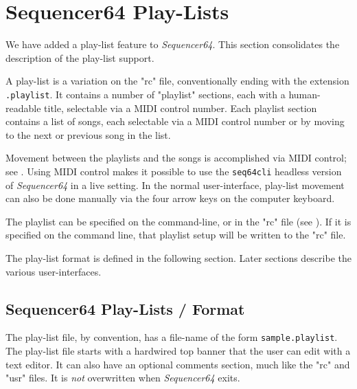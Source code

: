 %
%
%

\section{Sequencer64 Play-Lists}
\label{sec:playlist}

   We have added a play-list feature to \textsl{Sequencer64}.
   This section consolidates the description of the play-list support.

   A play-list is a variation on the "rc" file, conventionally ending with the
   extension \texttt{.playlist}.  It contains a number of "playlist" sections,
   each with a human-readable title, selectable via a MIDI control number.
   Each playlist section contains a list of songs, each selectable via a MIDI
   control number or by moving to the next or previous song in the list.

   Movement between the playlists and the songs is accomplished via 
   MIDI control; see
   .
   Using MIDI control makes it possible to use the \texttt{seq64cli}
   headless version of \textsl{Sequencer64} in a live setting.
   In the normal user-interface, play-list movement
   can also be done manually via the four arrow keys on the computer
   keyboard.

   The playlist can be specified on the command-line, or in
   the "rc" file (see ).
   If it is specified on the command line, that playlist setup will
   be written to the "rc" file.

   The play-list format is defined in the following section.
   Later sections describe the various user-interfaces.

\subsection{Sequencer64 Play-Lists / Format}
\label{subsec:playlist_setup}

   The play-list file, by convention, has a file-name of the form
   \texttt{sample.playlist}.
   The play-list file starts with a hardwired top banner that the user can edit
   with a text editor.  It can also have an optional comments section, much
   like the "rc" and "usr" files.  It is \textsl{not} overwritten
   when \textsl{Sequencer64} exits.


